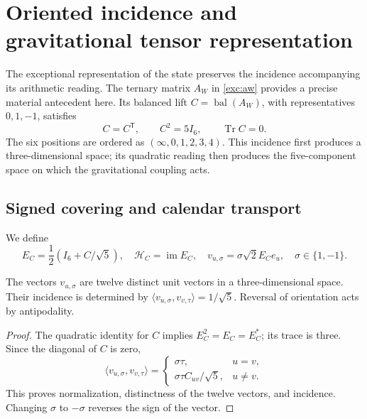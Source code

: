 \section{Oriented incidence and gravitational tensor representation}
\label{vii:sec:pentacomponente}
The exceptional representation of the state preserves the incidence accompanying
its arithmetic reading. The ternary matrix \(A_W\) in
\eqref{exc:aw} provides a precise material antecedent here. Its
balanced lift \(C=\operatorname{bal}(A_W)\), with representatives
\(0,1,-1\), satisfies
\[
 C=C^{\mathsf T},\qquad C^2=5I_6,\qquad \operatorname{Tr}C=0.
\]
The six positions are ordered as \((\infty,0,1,2,3,4)\).
This incidence first produces a three-dimensional space; its quadratic
reading then produces the five-component space on which
the gravitational coupling acts.

\subsection{Signed covering and calendar transport}
We define
\[
 E_C=\frac12(I_6+C/\sqrt5),\quad
 \mathcal H_C=\operatorname{im}E_C,\quad
 v_{u,\sigma}=\sigma\sqrt2E_Ce_u,\quad \sigma\in\{1,-1\}.
\]
\begin{proposition}
\label{vii:prop:doce-orientadas}
The vectors \(v_{u,\sigma}\) are twelve distinct unit vectors
in a three-dimensional space. Their incidence is determined by
\(\langle v_{u,\sigma},v_{v,\tau}\rangle=1/\sqrt5\).
Reversal of orientation acts by antipodality.
\end{proposition}
\begin{proof}
The quadratic identity for \(C\) implies \(E_C^2=E_C=E_C^*\);
its trace is three. Since the diagonal of \(C\) is zero,
\[
 \langle v_{u,\sigma},v_{v,\tau}\rangle
 =\begin{cases}\sigma\tau,&u=v,\\
 \sigma\tau C_{uv}/\sqrt5,&u\ne v.
 \end{cases}
\]
This proves normalization, distinctness of the twelve vectors, and incidence.
Changing \(\sigma\) to \(-\sigma\) reverses the sign of the vector.
\end{proof}

